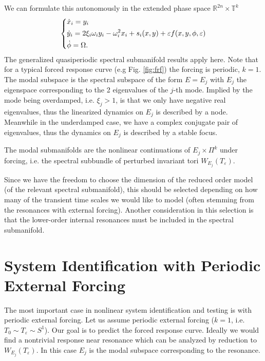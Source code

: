 We can formulate this autonomously in the extended phase space $\mathbb{R}^{2n}\times \mathbb{T}^{k}$ 
\begin{align}
	\begin{dcases}
		\dot{x}_i = y_i \\
		\dot{y}_i = 2 \xi_i \omega_i y_i - \omega_i^2 x_i + s_i(x,y) +\varepsilon f(x,y,\phi, \varepsilon)\\
		\dot{\phi} = \Omega.
	\end{dcases}
\end{align}
The generalized quasiperiodic spectral submanifold results apply here. Note that for a typical forced response curve (e.g Fig. \ref{fig:frf}) the forcing is periodic, $k=1$. The modal subspace is the spectral subspace of the form $E=E_j$ with $E_j$ the eigenspace corresponding to the 2 eigenvalues of the $j$-th mode. Implied by the mode being overdamped, i.e. $\xi_j>1$, is that we only have negative real eigenvalues, thus the linearized dynamics on $E_j$ is described by a node. Meanwhile in the underdamped case, we have a complex conjugate pair of eigenvalues, thus the dynamics on $E_j$ is described by a stable focus.  

The modal submanifolds are the nonlinear continuations of $E_j \times \Pi^{k}$ under forcing, i.e. the spectral subbundle of perturbed invariant tori $W_{E_j}(T_{\varepsilon})$. 


Since we have the freedom to choose the dimension of the reduced order model (of the relevant spectral submanifold), this should be selected depending on how many of the transient time scales we would like to model (often stemming from the resonances with external forcing). Another consideration in this selection is that the lower-order internal resonances must be included in the spectral submanifold.

\section{System Identification with Periodic External Forcing}
The most important case in nonlinear system identification and testing is with periodic external forcing. Let us assume periodic external forcing ($k=1$, i.e. $T_0 \sim T_{\varepsilon} \sim S^1$). Our goal is to predict the forced response curve. Ideally we would find a nontrivial response near resonance which can be analyzed by reduction to $W_{E_j}(T_{\varepsilon})$. In this case $E_j$ is the modal subspace corresponding to the resonance.

